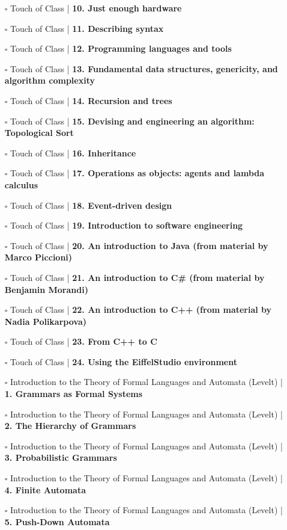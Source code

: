 \documentclass[a4, landscape, 12pt]{article}
\newcommand{\checkbox}{$\square$}%
\begin{document}
\begin{itemize}
{}
\item [\checkbox]  Touch of Class | \textbf{ 10. Just enough hardware
}
\item [\checkbox]  Touch of Class | \textbf{ 11. Describing syntax
}
\item [\checkbox]  Touch of Class | \textbf{ 12. Programming languages and tools
}
\item [\checkbox]  Touch of Class | \textbf{ 13. Fundamental data structures, genericity, and algorithm complexity
}
\item [\checkbox]  Touch of Class | \textbf{ 14. Recursion and trees
}
\item [\checkbox]  Touch of Class | \textbf{ 15. Devising and engineering an algorithm: Topological Sort
}
\item [\checkbox]  Touch of Class | \textbf{ 16. Inheritance
}
\item [\checkbox]  Touch of Class | \textbf{ 17. Operations as objects: agents and lambda calculus
}
\item [\checkbox]  Touch of Class | \textbf{ 18. Event-driven design
}
\item [\checkbox]  Touch of Class | \textbf{ 19. Introduction to software engineering
}
\item [\checkbox]  Touch of Class | \textbf{ 20. An introduction to Java (from material by Marco Piccioni)
}
\item [\checkbox]  Touch of Class | \textbf{ 21. An introduction to C# (from material by Benjamin Morandi)
}
\item [\checkbox]  Touch of Class | \textbf{ 22. An introduction to C++ (from material by Nadia Polikarpova)
}
\item [\checkbox]  Touch of Class | \textbf{ 23. From C++ to C
}
\item [\checkbox]  Touch of Class | \textbf{ 24. Using the EiffelStudio environment
}
\item [\checkbox]  Introduction to the Theory of Formal Languages and Automata (Levelt) | \textbf{ 1. Grammars as Formal Systems
}
\item [\checkbox]  Introduction to the Theory of Formal Languages and Automata (Levelt) | \textbf{ 2. The Hierarchy of Grammars
}
\item [\checkbox]  Introduction to the Theory of Formal Languages and Automata (Levelt) | \textbf{ 3. Probabilistic Grammars
}
\item [\checkbox]  Introduction to the Theory of Formal Languages and Automata (Levelt) | \textbf{ 4. Finite Automata
}
\item [\checkbox]  Introduction to the Theory of Formal Languages and Automata (Levelt) | \textbf{ 5. Push-Down Automata
}
\end{itemize}
\end{document}
